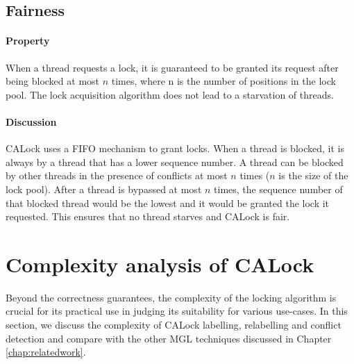 \subsection[Fairness]{Fairness}
\paragraph{Property} When a thread requests a lock, it is guaranteed to be granted its request after being blocked at most $\mathit{n}$ times, where n is the number of positions in the lock pool. 
The lock acquisition algorithm does not lead to a starvation of threads.

\paragraph{Discussion}
CALock uses a FIFO mechanism to grant locks. When a thread is blocked, it is always by a thread that has a lower sequence number.
A thread can be blocked by other threads in the presence of conflicts at most $n$ times ($n$ is the size of the lock pool).  
After a thread is  bypassed at most $n$ times, the sequence number of that blocked thread would be the lowest and it would be granted the lock it requested. 
This ensures that no thread starves and CALock is fair.


\section{Complexity analysis of CALock} \label{complexityAnalysis}

Beyond the correctness guarantees, the complexity of the locking algorithm is crucial for its practical use in judging its suitability for various use-cases. In this section, we discuss the complexity of CALock labelling, relabelling and conflict detection and compare with the other MGL techniques discussed in Chapter \ref{chap:relatedwork}.

